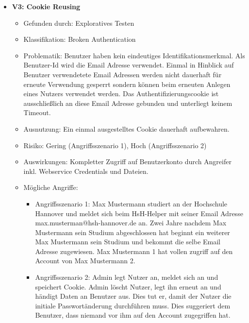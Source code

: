 \documentclass[12pt,DIV14,BCOR10mm,a4paper,parskip=half-,headsepline,headinclude,english,ngerman,bibliography=totocnumbered]{scrreprt}
\begin{document}
\begin{itemize}
  \hypertarget{vulnerability3}{}
  \item \textbf{V3: Cookie Reusing}
  \begin{itemize}
  \item Gefunden durch: Exploratives Testen
  \item Klassifikation: Broken Authentication
  \item Problematik: Benutzer haben kein eindeutiges Identifikationsmerkmal. Als Benutzer-Id wird die Email Adresse verwendet. Einmal in Hinblick auf Benutzer verwendetete Email Adressen werden nicht dauerhaft für erneute Verwendung gesperrt sondern können beim erneuten Anlegen eines Nutzers verwendet werden. Das Authentifizierungscookie ist ausschließlich an diese Email Adresse gebunden und unterliegt keinem Timeout.
  \item Ausnutzung: Ein einmal ausgestelltes Cookie dauerhaft aufbewahren.   
  \item Risiko: Gering (Angriffsszenario 1), Hoch (Angriffsszenario 2) 
  \item Auswirkungen: Kompletter Zugriff auf Benutzerkonto durch Angreifer inkl. Webservice Credentials und Dateien.
  \item Mögliche Angriffe: 
  	\begin{itemize}
  		\item Angriffsszenario 1: Max Mustermann studiert an der Hochschule Hannover und meldet sich beim HsH-Helper mit seiner Email Adresse max.musterman@hsh-hannover.de an. Zwei Jahre nachdem Max Mustermann sein Studium abgeschlossen hat beginnt ein weiterer Max Mustermann sein Studium und bekommt die selbe Email Adresse zugewiesen. Max Mustermann 1 hat vollen zugriff auf den Account von Max Mustermann 2. 
  		\item Angriffsszenario 2: Admin legt Nutzer an, meldet sich an und speichert Cookie. Admin löscht Nutzer, legt ihn erneut an und händigt Daten an Benutzer aus. Dies tut er, damit der Nutzer die initiale Passwortänderung durchführen muss. Dies suggeriert dem Benutzer, dass niemand vor ihm auf den Account zugegriffen hat.
  	\end{itemize}
  
  \end{itemize}


\end{itemize}
\end{document}
